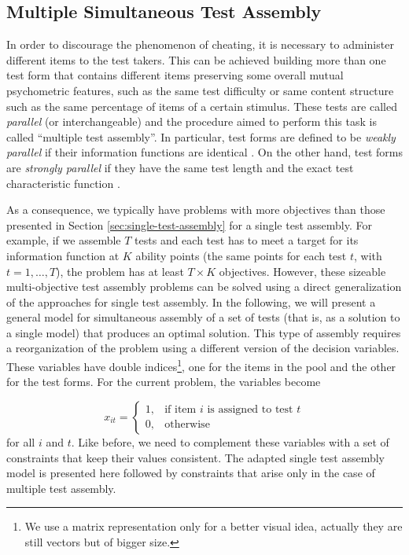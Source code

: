 \subsection{Multiple Simultaneous Test Assembly}\label{sec:multiple-test-assembly}

In order to discourage the phenomenon of cheating, it is necessary to administer different items to the test takers. This can be achieved building more than one test form that contains different items preserving some overall mutual psychometric features, such as the same test difficulty or same content structure such as the same percentage of items of a certain stimulus. These tests are called \emph{parallel} (or interchangeable) and the procedure aimed to perform this task is called ``multiple test assembly''. In particular, test forms are defined to be \emph{weakly parallel} if their information functions are identical \textcite{same77}. On the other hand, test forms are \emph{strongly parallel} if they have the same test length and the exact test characteristic function \textcite{Lord80}.

As a consequence, we typically have problems with more objectives than those presented in Section \ref{sec:single-test-assembly} for a single test assembly. For example, if we assemble $T$ tests and each test has to meet a target for its information function at $K$ ability points (the same points for each test $t$, with $t=1,\dots, T$), the problem has at least $T \times K$ objectives. However, these sizeable multi-objective test assembly problems can be solved using a direct generalization of the approaches for single test assembly. In the following, we will present a general model for simultaneous assembly of a set of tests (that is, as a solution to a single model) that produces an optimal solution.
This type of assembly requires a reorganization of the problem using a different version of the decision variables. These variables have double indices\footnote{We use a matrix representation only for a better visual idea, actually they are still vectors but of bigger size.}, one for the items in the pool and the other for the test forms. For the current problem, the variables become

\begin{equation*}\label{eq:MDV}
x_{it} =
\begin{cases}
1, & \mbox{if item } i \mbox{ is assigned to test }t\\


0, & \mbox{otherwise}
\end{cases}
\end{equation*}
for all $i$ and $t$.
Like before, we need to complement these variables with a set of constraints that keep their values consistent.
The adapted single test assembly model is presented here followed by constraints that arise only in the case of multiple test assembly.

